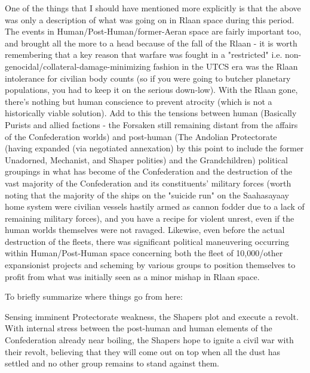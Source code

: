 One of the things that I should have mentioned more explicitly is that
the above was only a description of what was going on in Rlaan space
during this period. The events in Human/Post-Human/former-Aeran space
are fairly important too, and brought all the more to a head because
of the fall of the Rlaan - it is worth remembering that a key reason
that warfare was fought in a "restricted"
i.e. non-genocidal/collateral-damage-minimizing fashion in the UTCS
era was the Rlaan intolerance for civilian body counts (so if you were
going to butcher planetary populations, you had to keep it on the
serious down-low). With the Rlaan gone, there's nothing but human
conscience to prevent atrocity (which is not a historically viable
solution). Add to this the tensions between human (Basically Purists
and allied factions - the Forsaken still remaining distant from the
affairs of the Confederation worlds) and post-human (The Andolian
Protectorate (having expanded (via negotiated annexation) by this
point to include the former Unadorned, Mechanist, and Shaper polities)
and the Grandchildren) political groupings in what has become of the
Confederation and the destruction of the vast majority of the
Confederation and its constituents' military forces (worth noting that
the majority of the ships on the "suicide run" on the Saahasayaay home
system were civilian vessels hastily armed as cannon fodder due to a
lack of remaining military forces), and you have a recipe for violent
unrest, even if the human worlds themselves were not
ravaged. Likewise, even before the actual destruction of the fleets,
there was significant political maneuvering occurring within
Human/Post-Human space concerning both the fleet of 10,000/other
expansionist projects and scheming by various groups to position
themselves to profit from what was initially seen as a minor mishap in
Rlaan space.

To briefly summarize where things go from here: 

Sensing imminent Protectorate weakness, the Shapers plot and execute a
revolt. With internal stress between the post-human and human elements
of the Confederation already near boiling, the Shapers hope to ignite
a civil war with their revolt, believing that they will come out on
top when all the dust has settled and no other group remains to stand
against them.

